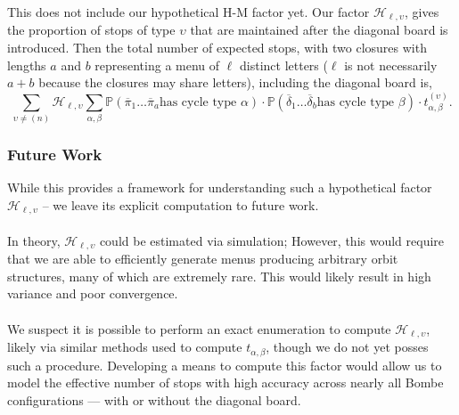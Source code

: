 This does not include our hypothetical H-M factor yet. Our factor
$\mathcal{H}_{\ell,\upsilon}$, gives the proportion of stops of type
$\upsilon$ that
are maintained after the diagonal board is introduced. Then the total
number of expected stops, with two closures with lengths $a$ and $b$
representing a menu of $\ell$ distinct letters ($\ell$ is not necessarily
$a+b$ because the closures may share letters), including the diagonal board is,
\[
  \sum_{\upsilon\ne(n)}\mathcal{H}_{\ell,\upsilon}\sum_{\alpha,\beta}\mathbb{P}(\overline\pi_1\dots\overline\pi_a\text{
      has cycle type
  }\alpha)\cdot\mathbb{P}(\overline\delta_1\dots\overline\delta_b\text{
  has cycle type }\beta)\cdot t_{\alpha,\beta}^{(\upsilon)}.
\]
\subsubsection{Future Work} While this provides a framework for
understanding such a hypothetical factor $\mathcal{H}_{\ell,\upsilon}$ -- we
leave its explicit computation to future work.
\\\\In theory, $\mathcal{H}_{\ell,\upsilon}$ could be estimated via simulation;
However, this would require that we are able to efficiently generate
menus producing arbitrary orbit structures, many of which are
extremely rare. This would likely result in high variance and poor convergence.
\\\\We suspect it is possible to perform an exact enumeration to
compute $\mathcal{H}_{\ell,\upsilon}$, likely via similar methods used to
compute $t_{\alpha,\beta}$, though we do not yet posses such a
procedure. Developing a means to compute this factor would allow us
to model the effective number of stops with high accuracy across
nearly all Bombe configurations — with or without the diagonal board.

